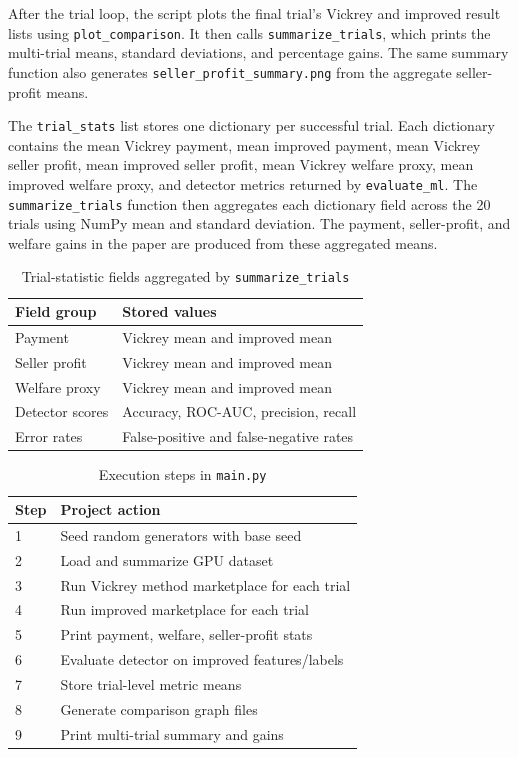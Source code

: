 \documentclass[conference]{IEEEtran}
\begin{document}
After the trial loop, the script plots the final trial's Vickrey and improved result lists using \texttt{plot\_comparison}. It then calls \texttt{summarize\_trials}, which prints the multi-trial means, standard deviations, and percentage gains. The same summary function also generates \texttt{seller\_profit\_summary.png} from the aggregate seller-profit means.

The \texttt{trial\_stats} list stores one dictionary per successful trial. Each dictionary contains the mean Vickrey payment, mean improved payment, mean Vickrey seller profit, mean improved seller profit, mean Vickrey welfare proxy, mean improved welfare proxy, and detector metrics returned by \texttt{evaluate\_ml}. The \texttt{summarize\_trials} function then aggregates each dictionary field across the 20 trials using NumPy mean and standard deviation. The payment, seller-profit, and welfare gains in the paper are produced from these aggregated means.

\begin{table}[htbp]
\caption{Trial-statistic fields aggregated by \texttt{summarize\_trials}}
\label{tab:trialstats}
\centering
\begin{tabular}{ll}
\toprule
\textbf{Field group} & \textbf{Stored values} \\
\midrule
Payment & Vickrey mean and improved mean \\
Seller profit & Vickrey mean and improved mean \\
Welfare proxy & Vickrey mean and improved mean \\
Detector scores & Accuracy, ROC-AUC, precision, recall \\
Error rates & False-positive and false-negative rates \\
\bottomrule
\end{tabular}
\end{table}

\begin{table}[htbp]
\caption{Execution steps in \texttt{main.py}}
\label{tab:execution}
\centering
\begin{tabular}{ll}
\toprule
\textbf{Step} & \textbf{Project action} \\
\midrule
1 & Seed random generators with base seed \\
2 & Load and summarize GPU dataset \\
3 & Run Vickrey method marketplace for each trial \\
4 & Run improved marketplace for each trial \\
5 & Print payment, welfare, seller-profit stats \\
6 & Evaluate detector on improved features/labels \\
7 & Store trial-level metric means \\
8 & Generate comparison graph files \\
9 & Print multi-trial summary and gains \\
\bottomrule
\end{tabular}
\end{table}
\end{document}
